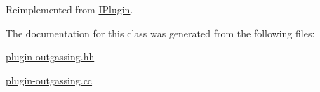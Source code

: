 Reimplemented from \hyperlink{classIPlugin_adcfd0fb076b3d72246d1dbdccecc69d6}{I\-Plugin}.



The documentation for this class was generated from the following files\-:\begin{DoxyCompactItemize}
\item 
\hyperlink{plugin-outgassing_8hh}{plugin-\/outgassing.\-hh}\item 
\hyperlink{plugin-outgassing_8cc}{plugin-\/outgassing.\-cc}\end{DoxyCompactItemize}
